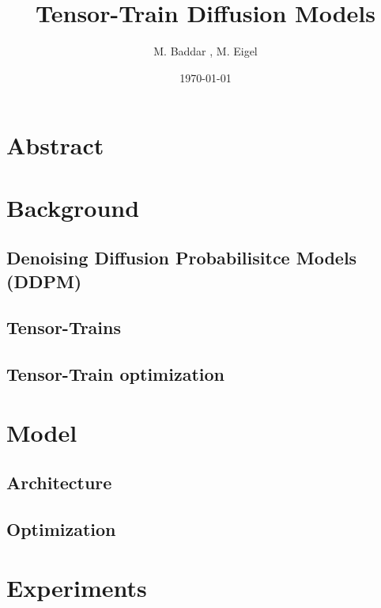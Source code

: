 \documentclass[11pt]{article}
\title{Tensor-Train Diffusion Models }
\author{M. Baddar , M. Eigel}
\date{\today}
\begin{document}
    \maketitle

    \section{Abstract}\label{sec:abstract}
    

    \section{Background}\label{sec:background}

    \subsection{Denoising Diffusion Probabilisitce Models (DDPM)}\label{subsec:ddpm}
    

    \subsection{Tensor-Trains}\label{subsec:tensor-trains}
    \subsection{Tensor-Train optimization}\label{subsec:tensor-train-optimization}

    \section{Model}\label{sec:proposed-model}

    \subsection{Architecture}\label{subsec:architecture}
    

    \subsection{Optimization}\label{subsec:optimization}
    

    \section{Experiments}\label{sec:experiments}
\end{document}
